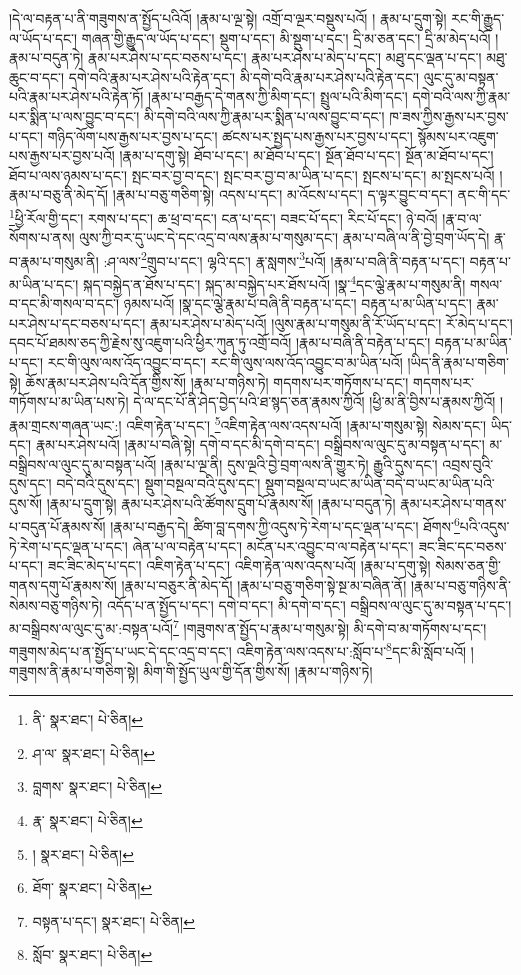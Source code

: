 །དེ་ལ་བརྟན་པ་ནི་གཟུགས་ན་སྤྱོད་པའིའོ། །རྣམ་པ་ལྔ་སྟེ། འགྲོ་བ་ལྔར་བསྡུས་པའོ། །
རྣམ་པ་དྲུག་སྟེ། རང་གི་རྒྱུད་ལ་ཡོད་པ་དང་། གཞན་གྱི་རྒྱུད་ལ་ཡོད་པ་དང་། སྡུག་པ་དང་། མི་སྡུག་པ་དང་། དྲི་མ་ཅན་དང་། དྲི་མ་མེད་པའོ། །རྣམ་པ་བདུན་ཏེ། རྣམ་པར་ཤེས་པ་དང་བཅས་པ་དང་། རྣམ་པར་ཤེས་པ་མེད་པ་དང་། མཐུ་དང་ལྡན་པ་དང་། མཐུ་ཆུང་བ་དང་། དགེ་བའི་རྣམ་པར་ཤེས་པའི་རྟེན་དང་། མི་དགེ་བའི་རྣམ་པར་ཤེས་པའི་རྟེན་དང་། ལུང་དུ་མ་བསྟན་པའི་རྣམ་པར་ཤེས་པའི་རྟེན་ཏོ། །རྣམ་པ་བརྒྱད་དེ་གནས་ཀྱི་མིག་དང་། སྤྲུལ་པའི་མིག་དང་། དགེ་བའི་ལས་ཀྱི་རྣམ་པར་སྨིན་པ་ལས་བྱུང་བ་དང་། མི་དགེ་བའི་ལས་ཀྱི་རྣམ་པར་སྨིན་པ་ལས་བྱུང་བ་དང་། ཁ་ཟས་ཀྱིས་རྒྱས་པར་བྱས་པ་དང་། གཉིད་ལོག་པས་རྒྱས་པར་བྱས་པ་དང་། ཚངས་པར་སྤྱད་པས་རྒྱས་པར་བྱས་པ་དང་། སྙོམས་པར་འཇུག་པས་རྒྱས་པར་བྱས་པའོ། །རྣམ་པ་དགུ་སྟེ། ཐོབ་པ་དང་། མ་ཐོབ་པ་དང་། སྔོན་ཐོབ་པ་དང་། སྔོན་མ་ཐོབ་པ་དང་། ཐོབ་པ་ལས་ཉམས་པ་དང་། སྤང་བར་བྱ་བ་དང་། སྤང་བར་བྱ་བ་མ་ཡིན་པ་དང་། སྤངས་པ་དང་། མ་སྤངས་པའོ། །རྣམ་པ་བཅུ་ནི་མེད་དོ། །རྣམ་པ་བཅུ་གཅིག་སྟེ། འདས་པ་དང་། མ་འོངས་པ་དང་། ད་ལྟར་བྱུང་བ་དང་། ནང་གི་དང་\footnote{ནི་  སྣར་ཐང་།  པེ་ཅིན། }ཕྱི་རོལ་གྱི་དང་། རགས་པ་དང་། ཆ་ཕྲ་བ་དང་། ངན་པ་དང་། བཟང་པོ་དང་། རིང་པོ་དང་། ཉེ་བའོ། །རྣ་བ་ལ་སོགས་པ་ནས། ལུས་ཀྱི་བར་དུ་ཡང་དེ་དང་འདྲ་བ་ལས་རྣམ་པ་གསུམ་དང་། རྣམ་པ་བཞི་ལ་ནི་བྱེ་བྲག་ཡོད་དེ། རྣ་བ་རྣམ་པ་གསུམ་ནི། :ཤ་ལས་\footnote{ཤ་ལ་  སྣར་ཐང་།  པེ་ཅིན། }གྲུབ་པ་དང་། ལྷའི་དང་། རྣ་སླགས་\footnote{བླགས་  སྣར་ཐང་།  པེ་ཅིན། }པའོ། །རྣམ་པ་བཞི་ནི་བརྟན་པ་དང་། བརྟན་པ་མ་ཡིན་པ་དང་། སྐད་བསྐྱེད་ན་ཐོས་པ་དང་། སྐད་མ་བསྐྱེད་པར་ཐོས་པའོ། །སྣ་\footnote{རྣ་  སྣར་ཐང་།  པེ་ཅིན། }དང་ལྕེ་རྣམ་པ་གསུམ་ནི། གསལ་བ་དང་མི་གསལ་བ་དང་། ཉམས་པའོ། །སྣ་དང་ལྕེ་རྣམ་པ་བཞི་ནི་བརྟན་པ་དང་། བརྟན་པ་མ་ཡིན་པ་དང་། རྣམ་པར་ཤེས་པ་དང་བཅས་པ་དང་། རྣམ་པར་ཤེས་པ་མེད་པའོ། །ལུས་རྣམ་པ་གསུམ་ནི་རོ་ཡོད་པ་དང་། རོ་མེད་པ་དང་། དབང་པོ་ཐམས་ཅད་ཀྱི་རྗེས་སུ་འཇུག་པའི་ཕྱིར་ཀུན་ཏུ་འགྲོ་བའོ། །རྣམ་པ་བཞི་ནི་བརྟེན་པ་དང་། བརྟན་པ་མ་ཡིན་པ་དང་། རང་གི་ལུས་ལས་འོད་འབྱུང་བ་དང་། རང་གི་ལུས་ལས་འོད་འབྱུང་བ་མ་ཡིན་པའོ། །ཡིད་ནི་རྣམ་པ་གཅིག་སྟེ། ཆོས་རྣམ་པར་ཤེས་པའི་དོན་གྱིས་སོ། །རྣམ་པ་གཉིས་ཏེ། གདགས་པར་གཏོགས་པ་དང་། གདགས་པར་གཏོགས་པ་མ་ཡིན་པས་ཏེ། དེ་ལ་དང་པོ་ནི་ཤེད་བྱེད་པའི་ཐ་སྙད་ཅན་རྣམས་ཀྱིའོ། །ཕྱི་མ་ནི་བྱིས་པ་རྣམས་ཀྱིའོ། །རྣམ་གྲངས་གཞན་ཡང་:། འཇིག་རྟེན་པ་དང་། \footnote{།    སྣར་ཐང་།  པེ་ཅིན། }འཇིག་རྟེན་ལས་འདས་པའོ། །རྣམ་པ་གསུམ་སྟེ། སེམས་དང་། ཡིད་དང་། རྣམ་པར་ཤེས་པའོ། །རྣམ་པ་བཞི་སྟེ། དགེ་བ་དང་མི་དགེ་བ་དང་། བསྒྲིབས་ལ་ལུང་དུ་མ་བསྟན་པ་དང་། མ་བསྒྲིབས་ལ་ལུང་དུ་མ་བསྟན་པའོ། །རྣམ་པ་ལྔ་ནི། དུས་ལྔའི་བྱེ་བྲག་ལས་ནི་གྱུར་ཏེ། རྒྱུའི་དུས་དང་། འབྲས་བུའི་དུས་དང་། བདེ་བའི་དུས་དང་། སྡུག་བསྔལ་བའི་དུས་དང་། སྡུག་བསྔལ་བ་ཡང་མ་ཡིན་བདེ་བ་ཡང་མ་ཡིན་པའི་དུས་སོ། །རྣམ་པ་དྲུག་སྟེ། རྣམ་པར་ཤེས་པའི་ཚོགས་དྲུག་པོ་རྣམས་སོ། །རྣམ་པ་བདུན་ཏེ། རྣམ་པར་ཤེས་པ་གནས་པ་བདུན་པོ་རྣམས་སོ། །རྣམ་པ་བརྒྱད་དེ། ཚིག་བླ་དགས་ཀྱི་འདུས་ཏེ་རེག་པ་དང་ལྡན་པ་དང་། ཐོགས་\footnote{ཐོག་  སྣར་ཐང་།  པེ་ཅིན། }པའི་འདུས་ཏེ་རེག་པ་དང་ལྡན་པ་དང་། ཞེན་པ་ལ་བརྟེན་པ་དང་། མངོན་པར་འབྱུང་བ་ལ་བརྟེན་པ་དང་། ཟང་ཟིང་དང་བཅས་པ་དང་། ཟང་ཟིང་མེད་པ་དང་། འཇིག་རྟེན་པ་དང་། འཇིག་རྟེན་ལས་འདས་པའོ། །རྣམ་པ་དགུ་སྟེ། སེམས་ཅན་གྱི་གནས་དགུ་པོ་རྣམས་སོ། །རྣམ་པ་བཅུར་ནི་མེད་དོ། །རྣམ་པ་བཅུ་གཅིག་སྟེ་སྔ་མ་བཞིན་ནོ། །རྣམ་པ་བཅུ་གཉིས་ནི་སེམས་བཅུ་གཉིས་ཏེ། འདོད་པ་ན་སྤྱོད་པ་དང་། དགེ་བ་དང་། མི་དགེ་བ་དང་། བསྒྲིབས་ལ་ལུང་དུ་མ་བསྟན་པ་དང་། མ་བསྒྲིབས་ལ་ལུང་དུ་མ་:བསྟན་པའོ།\footnote{བསྟན་པ་དང་།  སྣར་ཐང་།  པེ་ཅིན། } །གཟུགས་ན་སྤྱོད་པ་རྣམ་པ་གསུམ་སྟེ། མི་དགེ་བ་མ་གཏོགས་པ་དང་། གཟུགས་མེད་པ་ན་སྤྱོད་པ་ཡང་དེ་དང་འདྲ་བ་དང་། འཇིག་རྟེན་ལས་འདས་པ་:སློབ་པ་\footnote{སློབ་  སྣར་ཐང་།  པེ་ཅིན། }དང་མི་སློབ་པའོ། །གཟུགས་ནི་རྣམ་པ་གཅིག་སྟེ། མིག་གི་སྤྱོད་ཡུལ་གྱི་དོན་གྱིས་སོ། །རྣམ་པ་གཉིས་ཏེ། 